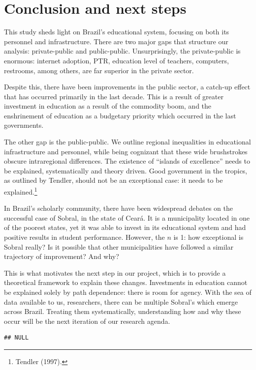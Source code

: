 \documentclass[12pt,]{article}
\let\rmarkdownfootnote\footnote%
\def\footnote{\protect\rmarkdownfootnote}
\begin{document}
\section{Conclusion and next steps}

This study sheds light on Brazil's educational system, focusing on both
its personnel and infrastructure. There are two major gaps that
structure our analysis: private-public and public-public.
Unsurprisingly, the private-public is enormous: internet adoption, PTR,
education level of teachers, computers, restrooms, among others, are far
superior in the private sector.

Despite this, there have been improvements in the public sector, a
catch-up effect that has occurred primarily in the last decade. This is
a result of greater investment in education as a result of the commodity
boom, and the enshrinement of education as a budgetary priority which
occurred in the last governments.

The other gap is the public-public. We outline regional inequalities in
educational infrastructure and personnel, while being cognizant that
these wide brushstrokes obscure intraregional differences. The existence
of ``islands of excellence'' needs to be explained, systematically and
theory driven. Good government in the tropics, as outlined by Tendler,
should not be an exceptional case: it needs to be explained.\footnote{Tendler
  (1997).}

In Brazil's scholarly community, there have been widespread debates on
the successful case of Sobral, in the state of Ceará. It is a
municipality located in one of the poorest states, yet it was able to
invest in its educational system and had positive results in student
performance. However, the \(n\) is 1: how exceptional is Sobral really?
Is it possible that other municipalities have followed a similar
trajectory of improvement? And why?

This is what motivates the next step in our project, which is to provide
a theoretical framework to explain these changes. Investments in
education cannot be explained solely by path dependence: there is room
for agency. With the sea of data available to us, researchers, there can
be multiple Sobral's which emerge across Brazil. Treating them
systematically, understanding how and why these occur will be the next
iteration of our research agenda.

\begin{verbatim}
## NULL
\end{verbatim}
\end{document}

